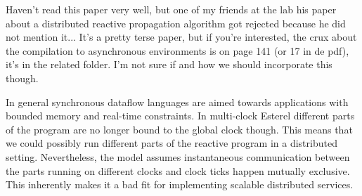 Haven't read this paper very well, but one of my friends at the lab his paper about a distributed reactive propagation algorithm got rejected because he did not mention it...
It's a pretty terse paper, but if you're interested, the crux about the compilation to asynchronous environments is on page 141 (or 17 in de pdf), it's in the related folder. I'm not sure if and how we should incorporate this though. \newline


\cite{lustre}\cite{signal} In general synchronous dataflow languages are aimed towards applications with bounded memory and real-time constraints. In multi-clock Esterel\cite{esterel} different parts of the program are no longer bound to the global clock though. This means that we could possibly run different parts of the reactive program in a distributed setting. Nevertheless, the model assumes instantaneous communication between the parts running on different clocks and clock ticks happen mutually exclusive. This inherently makes it a bad fit for implementing scalable distributed services.


\cite{orleans}
